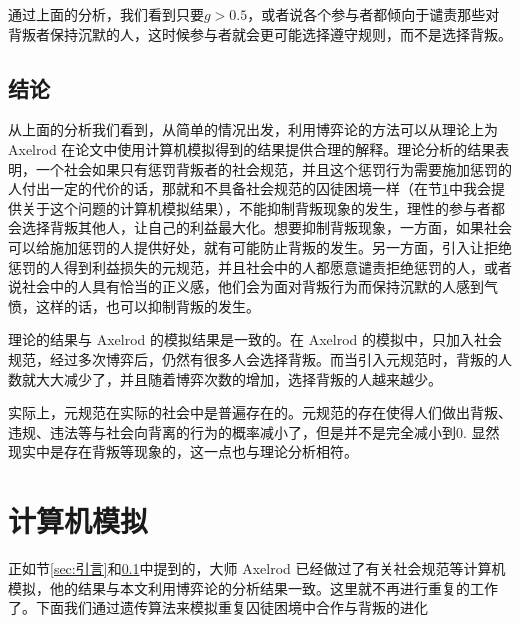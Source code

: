 \documentclass[lang=cn,11pt]{elegantpaper}
\begin{document}
通过上面的分析，我们看到只要$g>0.5$，或者说各个参与者都倾向于谴责那些对背叛者保持沉默的人，这时候参与者就会更可能选择遵守规则，而不是选择背叛。

\subsection{结论}\label{sec:结论}
从上面的分析我们看到，从简单的情况出发，利用博弈论的方法可以从理论上为 Axelrod 在论文\cite{Axelrod1986}中使用计算机模拟得到的结果提供合理的解释。理论分析的结果表明，一个社会如果只有惩罚背叛者的社会规范，并且这个惩罚行为需要施加惩罚的人付出一定的代价的话，那就和不具备社会规范的囚徒困境一样（在节\ref{sec:囚徒困境}中我会提供关于这个问题的计算机模拟结果），不能抑制背叛现象的发生，理性的参与者都会选择背叛其他人，让自己的利益最大化。想要抑制背叛现象，一方面，如果社会可以给施加惩罚的人提供好处，就有可能防止背叛的发生。另一方面，引入让拒绝惩罚的人得到利益损失的元规范，并且社会中的人都愿意谴责拒绝惩罚的人，或者说社会中的人具有恰当的正义感，他们会为面对背叛行为而保持沉默的人感到气愤，这样的话，也可以抑制背叛的发生。

理论的结果与 Axelrod 的模拟结果\cite{Axelrod1986}是一致的。在 Axelrod 的模拟中，只加入社会规范，经过多次博弈后，仍然有很多人会选择背叛。而当引入元规范时，背叛的人数就大大减少了，并且随着博弈次数的增加，选择背叛的人越来越少。

实际上，元规范在实际的社会中是普遍存在的。元规范的存在使得人们做出背叛、违规、违法等与社会向背离的行为的概率减小了，但是并不是完全减小到0. 显然现实中是存在背叛等现象的，这一点也与理论分析相符。

\section{计算机模拟}\label{sec:囚徒困境}
正如节\ref{sec:引言}和\ref{sec:结论}中提到的，大师 Axelrod 已经做过了有关社会规范等计算机模拟\cite{Axelrod1986}\cite{axelrod1981evolution}，他的结果与本文利用博弈论的分析结果一致。这里就不再进行重复的工作了。下面我们通过遗传算法来模拟重复囚徒困境中合作与背叛的进化
\end{document}
